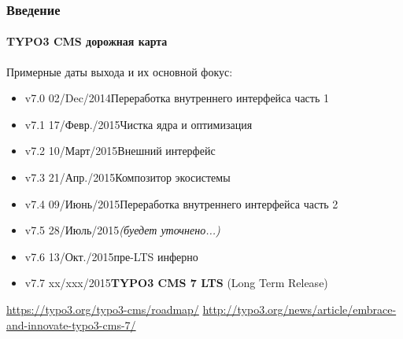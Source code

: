 
\begin{frame}[fragile]
	\frametitle{Введение}
	\framesubtitle{TYPO3 CMS дорожная карта}

	Примерные даты выхода и их основной фокус:

	\begin{itemize}
		\item
			\smaller
				\begingroup
					\color{typo3orange}
						v7.0 \textrightarrow\tabto{1.3cm}02/Dec/2014\tabto{3.4cm}Переработка внутреннего интерфейса часть 1
				\endgroup
			\normalsize

		\item\smaller v7.1 \textrightarrow\tabto{1.2cm}17/Февр./2015\tabto{3.4cm}Чистка ядра и оптимизация\normalsize
		\item\smaller v7.2 \textrightarrow\tabto{1.2cm}10/Март/2015\tabto{3.4cm}Внешний интерфейс\normalsize
		\item\smaller v7.3 \textrightarrow\tabto{1.2cm}21/Апр./2015\tabto{3.4cm}Композитор экосистемы\normalsize
		\item\smaller v7.4 \textrightarrow\tabto{1.2cm}09/Июнь/2015\tabto{3.4cm}Переработка внутреннего интерфейса часть 2\normalsize
		\item\smaller v7.5 \textrightarrow\tabto{1.2cm}28/Июль/2015\tabto{3.4cm}\textit{(буедет уточнено...)}\normalsize
		\item\smaller v7.6 \textrightarrow\tabto{1.2cm}13/Окт./2015\tabto{3.4cm}пре-LTS инферно\normalsize
		\item\smaller v7.7 \textrightarrow\tabto{1.2cm}xx/xxx/2015\tabto{3.4cm}\textbf{TYPO3 CMS 7 LTS} (Long Term Release)\normalsize
	\end{itemize}

	\smaller
		\url{https://typo3.org/typo3-cms/roadmap/}\newline
		\url{http://typo3.org/news/article/embrace-and-innovate-typo3-cms-7/}
	\normalsize

\end{frame}


